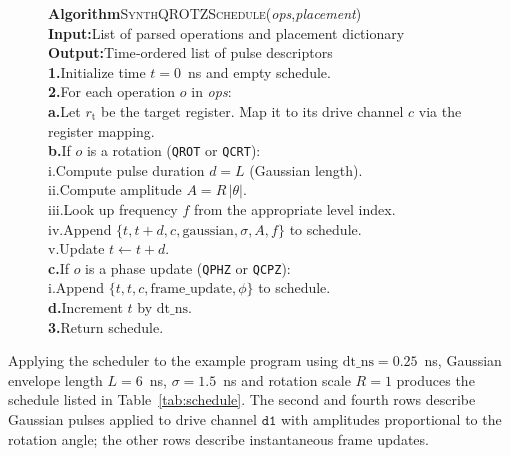 \documentclass[11pt]{article}
\begin{document}
\begin{figure}[H]
\centering
\begin{minipage}{0.95\linewidth}
\begin{footnotesize}
\begin{tabbing}
\textbf{Algorithm}\quad\=\textsc{SynthQROTZSchedule}(\textit{ops},\textit{placement})\\
\textbf{Input:}\>List of parsed operations and placement dictionary\\
\textbf{Output:}\>Time‑ordered list of pulse descriptors\\
\textbf{1.}\>Initialize time $t=0$~ns and empty schedule.\\
\textbf{2.}\>For each operation $o$ in \textit{ops}:\\
\>\textbf{a.}\>Let $r_{\mathrm{t}}$ be the target register.  Map it to its
 drive channel $c$ via the register mapping.\\
\>\textbf{b.}\>If $o$ is a rotation (\texttt{QROT} or \texttt{QCRT}):\\
\>\quad i.\>Compute pulse duration $d=L$ (Gaussian length).\\
\>\quad ii.\>Compute amplitude $A = R\,|\theta|$.\\
\>\quad iii.\>Look up frequency $f$ from the appropriate level index.\\
\>\quad iv.\>Append $\{t, t+d, c, \text{gaussian}, \sigma, A, f\}$ to schedule.\\
\>\quad v.\>Update $t \leftarrow t + d$.\\
\>\textbf{c.}\>If $o$ is a phase update (\texttt{QPHZ} or \texttt{QCPZ}):\\
\>\quad i.\>Append $\{t, t, c, \text{frame\_update}, \phi\}$ to schedule.\\
\>\textbf{d.}\>Increment $t$ by $\mathrm{dt\_ns}$.\\
\textbf{3.}\>Return schedule.\\
\end{tabbing}
\end{footnotesize}
\end{minipage}
\end{figure}

Applying the scheduler to the example program using $\mathrm{dt\_ns}=0.25$~ns,
Gaussian envelope length $L=6$~ns, $\sigma=1.5$~ns and rotation scale
$R=1$ produces the schedule listed in Table~\ref{tab:schedule}.  The
second and fourth rows describe Gaussian pulses applied to drive
channel $\texttt{d1}$ with amplitudes proportional to the rotation
angle; the other rows describe instantaneous frame updates.
\end{document}
